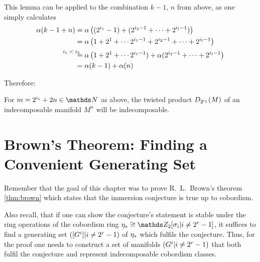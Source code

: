   This lemma can be applied to the combination $k-1$, $n$ from above, as one
  simply calculates
  \begin{align*}
    \alpha(k-1+n)
    &= \alpha\left((2^{i_1}-1)+ (2^{i_2-1}+\dotsb+2^{i_l-1})\right) \\
    &= \alpha\left(1+2^1+\dotsb 2^{i_1-1} + 2^{i_2-1}+\dotsb+2^{i_l-1}\right) \\
    &\equalsby{$i_1<i_2$}
      \alpha\left(1+2^1+\dotsb 2^{i_1-1}) + \alpha(2^{i_2-1}+\dotsb+2^{i_l-1}\right)\\
    &= \alpha(k-1) + \alpha(n)
  \end{align*}

  Therefore:
  \begin{Cor}\label{cor:twistedprod:indecompcriterion}
    For $m=2^{i_1}+2n\in\Nat$ as above, the twisted product
    $D_{2^{i_1}}({M})$ of an indecomposable manifold $M^n$ will be
    indecomposable.
  \end{Cor}


  \section
  {Brown's Theorem: Finding a Convenient Generating Set}
  \label{sec:proofbrown}
  Remember that the goal of this chapter was to prove R.~L.~Brown's
  theorem \ref{thm:brown} which states that the immersion conjecture is
  true up to cobordism.

  Also recall, that if one can show the conjecture's statement is stable
  under the ring operations of the cobordism ring
  $\c_*\cong\Zmod2[\sigma_i|i\neq2^r-1]$, it suffices to find a
  generating set $([G^{i}]|i\neq2^r-1)$ of $\eta_*$ which fulfils the conjecture.
  Thus, for the proof one needs to construct a set of manifolds
  $(G^{i}|i\neq2^r-1)$ that both fulfil the conjecture and represent
  indecomposable cobordism classes.

